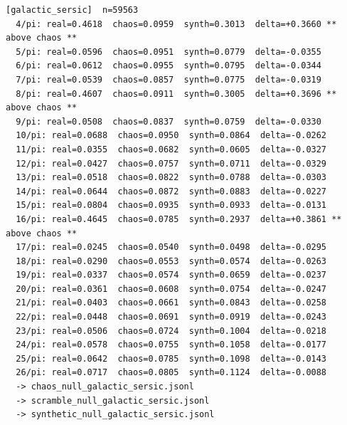 \documentclass[11pt, letterpaper, openany]{book}
\begin{document}
\begin{empiricalbox}
\begin{lstlisting}[style=terminal]
[galactic_sersic]  n=59563
  4/pi: real=0.4618  chaos=0.0959  synth=0.3013  delta=+0.3660 ** above chaos **
  5/pi: real=0.0596  chaos=0.0951  synth=0.0779  delta=-0.0355
  6/pi: real=0.0612  chaos=0.0955  synth=0.0795  delta=-0.0344
  7/pi: real=0.0539  chaos=0.0857  synth=0.0775  delta=-0.0319
  8/pi: real=0.4607  chaos=0.0911  synth=0.3005  delta=+0.3696 ** above chaos **
  9/pi: real=0.0508  chaos=0.0837  synth=0.0759  delta=-0.0330
  10/pi: real=0.0688  chaos=0.0950  synth=0.0864  delta=-0.0262
  11/pi: real=0.0355  chaos=0.0682  synth=0.0605  delta=-0.0327
  12/pi: real=0.0427  chaos=0.0757  synth=0.0711  delta=-0.0329
  13/pi: real=0.0518  chaos=0.0822  synth=0.0788  delta=-0.0303
  14/pi: real=0.0644  chaos=0.0872  synth=0.0883  delta=-0.0227
  15/pi: real=0.0804  chaos=0.0935  synth=0.0933  delta=-0.0131
  16/pi: real=0.4645  chaos=0.0785  synth=0.2937  delta=+0.3861 ** above chaos **
  17/pi: real=0.0245  chaos=0.0540  synth=0.0498  delta=-0.0295
  18/pi: real=0.0290  chaos=0.0553  synth=0.0574  delta=-0.0263
  19/pi: real=0.0337  chaos=0.0574  synth=0.0659  delta=-0.0237
  20/pi: real=0.0361  chaos=0.0608  synth=0.0754  delta=-0.0247
  21/pi: real=0.0403  chaos=0.0661  synth=0.0843  delta=-0.0258
  22/pi: real=0.0448  chaos=0.0691  synth=0.0919  delta=-0.0243
  23/pi: real=0.0506  chaos=0.0724  synth=0.1004  delta=-0.0218
  24/pi: real=0.0578  chaos=0.0755  synth=0.1058  delta=-0.0177
  25/pi: real=0.0642  chaos=0.0785  synth=0.1098  delta=-0.0143
  26/pi: real=0.0717  chaos=0.0805  synth=0.1124  delta=-0.0088
  -> chaos_null_galactic_sersic.jsonl
  -> scramble_null_galactic_sersic.jsonl
  -> synthetic_null_galactic_sersic.jsonl


\end{lstlisting}
\end{empiricalbox}
\end{document}
